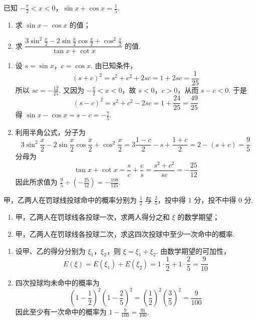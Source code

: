 \begin{problem}
已知 \(-\frac{\pi}{2} < x < 0\)，\(\sin x + \cos x = \frac{1}{5}\).

\begin{enumerate}
\item 求 \(\sin x - \cos x\) 的值；
\item 求 \(\dfrac{3\sin^2 \frac{x}{2} - 2\sin \frac{x}{2}\cos \frac{x}{2} + \cos^2 \frac{x}{2}}{\tan x + \cot x}\) 的值.
\end{enumerate}
\end{problem}


\begin{solution}
\begin{enumerate}
\item 设 \(s=\sin x\)，\(c=\cos x\). 由已知条件，
\[
(s+c)^2=s^2+c^2+2sc=1+2sc=\frac{1}{25}
\]
所以 \(sc=-\frac{12}{25}\). 又因为 \(-\frac{\pi}{2}<x<0\)，故 \(s<0\)，\(c>0\)，从而 \(s-c<0\). 于是
\[
(s-c)^2=s^2+c^2-2sc=1+\frac{24}{25}=\frac{49}{25}
\]
得 \(\sin x-\cos x=s-c=-\frac{7}{5}\).
\item 利用半角公式，分子为
\[
3\sin^2\frac{x}{2}-2\sin\frac{x}{2}\cos\frac{x}{2}+\cos^2\frac{x}{2}
=3\frac{1-c}{2}-s+\frac{1+c}{2}
=2-(s+c)=\frac{9}{5}
\]
分母为
\[
\tan x+\cot x=\frac{s}{c}+\frac{c}{s}=\frac{s^2+c^2}{sc}=-\frac{25}{12}
\]
因此所求值为 \(\frac{9}{5}\div\left(-\frac{25}{12}\right)=-\frac{108}{125}\).
\end{enumerate}
\end{solution}




\begin{problem}
甲，乙两人在罚球线投球命中的概率分别为 \(\frac{1}{2}\) 与 \(\frac{2}{5}\)，投中得 \(1\text{ 分}\)，投不中得 \(0\text{ 分}\).

\begin{enumerate}
\item 甲，乙两人在罚球线各投球一次，求两人得分之和 \(\xi\) 的数学期望；
\item 甲，乙两人在罚球线各投球二次，求这四次投球中至少一次命中的概率.
\end{enumerate}
\end{problem}


\begin{solution}
\begin{enumerate}
\item 设甲、乙的得分分别为 \(\xi_1\)，\(\xi_2\)，则 \(\xi=\xi_1+\xi_2\). 由数学期望的可加性，
\[
E(\xi)=E(\xi_1)+E(\xi_2)=1\cdot\frac{1}{2}+1\cdot\frac{2}{5}=\frac{9}{10}
\]
\item 四次投球均未命中的概率为
\[
\left(1-\frac{1}{2}\right)^2\left(1-\frac{2}{5}\right)^2
=\left(\frac{1}{2}\right)^2\left(\frac{3}{5}\right)^2=\frac{9}{100}
\]
因此至少有一次命中的概率为 \(1-\frac{9}{100}=\frac{91}{100}\).
\end{enumerate}
\end{solution}


